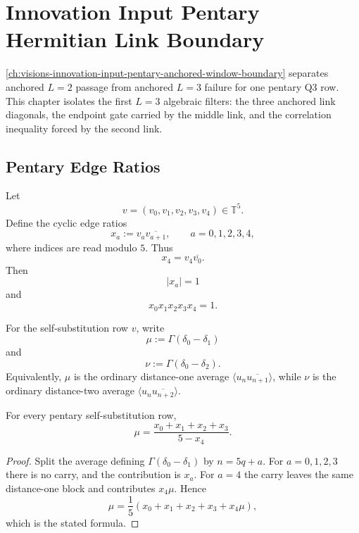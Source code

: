 \chapter{Innovation Input Pentary Hermitian Link Boundary}
\label{ch:visions-innovation-input-pentary-lthree-hermitian-boundary}

\autoref{ch:visions-innovation-input-pentary-anchored-window-boundary}
separates anchored $L=2$ passage from anchored $L=3$ failure for one
pentary Q3 row. This chapter isolates the first $L=3$ algebraic filters:
the three anchored link diagonals, the endpoint gate carried by the
middle link, and the correlation inequality forced by the second link.

\section{Pentary Edge Ratios}
\label{sec:innovation-input-pentary-edge-ratios}

\begin{definition}
\label{def:innovation-input-pentary-edge-ratios}
Let
$$
v=(v_0,v_1,v_2,v_3,v_4)\in\mathbb T^5.
$$
Define the cyclic edge ratios
$$
x_a:=v_a\overline{v_{a+1}},
\qquad
a=0,1,2,3,4,
$$
where indices are read modulo $5$. Thus
$$
x_4=v_4\overline{v_0}.
$$
Then
$$
|x_a|=1
$$
and
$$
x_0x_1x_2x_3x_4=1.
$$
\end{definition}

\begin{definition}
\label{def:innovation-input-pentary-first-second-correlations}
For the self-substitution row $v$, write
$$
\mu:=\Gamma(\delta_0-\delta_1)
$$
and
$$
\nu:=\Gamma(\delta_0-\delta_2).
$$
Equivalently, $\mu$ is the ordinary distance-one average
$\langle u_n\overline{u_{n+1}}\rangle$, while $\nu$ is the ordinary
distance-two average $\langle u_n\overline{u_{n+2}}\rangle$.
\end{definition}

\begin{theorem}
\label{thm:innovation-input-pentary-first-correlation-formula}
For every pentary self-substitution row,
$$
\mu
=
\frac{x_0+x_1+x_2+x_3}{5-x_4}.
$$
\end{theorem}

\begin{proof}
Split the average defining $\Gamma(\delta_0-\delta_1)$ by $n=5q+a$.
For $a=0,1,2,3$ there is no carry, and the contribution is $x_a$. For
$a=4$ the carry leaves the same distance-one block and contributes
$x_4\mu$. Hence
$$
\mu
=
\frac15
\left(
x_0+x_1+x_2+x_3+x_4\mu
\right),
$$
which is the stated formula.
\end{proof}

